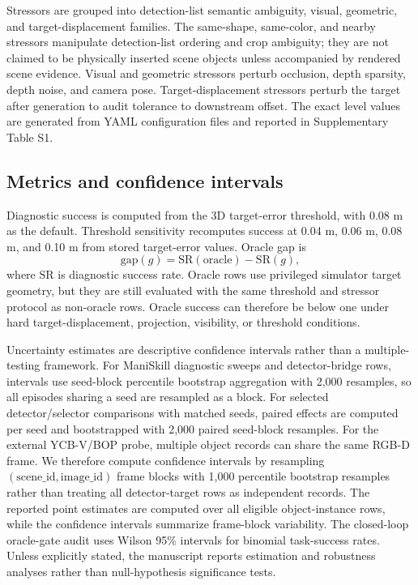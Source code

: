 Stressors are grouped into detection-list semantic ambiguity, visual, geometric, and target-displacement families. The same-shape, same-color, and nearby stressors manipulate detection-list ordering and crop ambiguity; they are not claimed to be physically inserted scene objects unless accompanied by rendered scene evidence. Visual and geometric stressors perturb occlusion, depth sparsity, depth noise, and camera pose. Target-displacement stressors perturb the target after generation to audit tolerance to downstream offset. The exact level values are generated from YAML configuration files and reported in Supplementary Table S1.

\subsection{Metrics and confidence intervals}

Diagnostic success is computed from the 3D target-error threshold, with 0.08 m as the default. Threshold sensitivity recomputes success at 0.04 m, 0.06 m, 0.08 m, and 0.10 m from stored target-error values. Oracle gap is
\[
\mathrm{gap}(g)=\mathrm{SR}(\mathrm{oracle})-\mathrm{SR}(g),
\]
where \(\mathrm{SR}\) is diagnostic success rate. Oracle rows use privileged simulator target geometry, but they are still evaluated with the same threshold and stressor protocol as non-oracle rows. Oracle success can therefore be below one under hard target-displacement, projection, visibility, or threshold conditions.

Uncertainty estimates are descriptive confidence intervals rather than a multiple-testing framework. For ManiSkill diagnostic sweeps and detector-bridge rows, intervals use seed-block percentile bootstrap aggregation with 2,000 resamples, so all episodes sharing a seed are resampled as a block. For selected detector/selector comparisons with matched seeds, paired effects are computed per seed and bootstrapped with 2,000 paired seed-block resamples. For the external YCB-V/BOP probe, multiple object records can share the same RGB-D frame. We therefore compute confidence intervals by resampling \((\mathrm{scene\_id}, \mathrm{image\_id})\) frame blocks with 1,000 percentile bootstrap resamples rather than treating all detector-target rows as independent records. The reported point estimates are computed over all eligible object-instance rows, while the confidence intervals summarize frame-block variability. The closed-loop oracle-gate audit uses Wilson 95\% intervals for binomial task-success rates. Unless explicitly stated, the manuscript reports estimation and robustness analyses rather than null-hypothesis significance tests.

